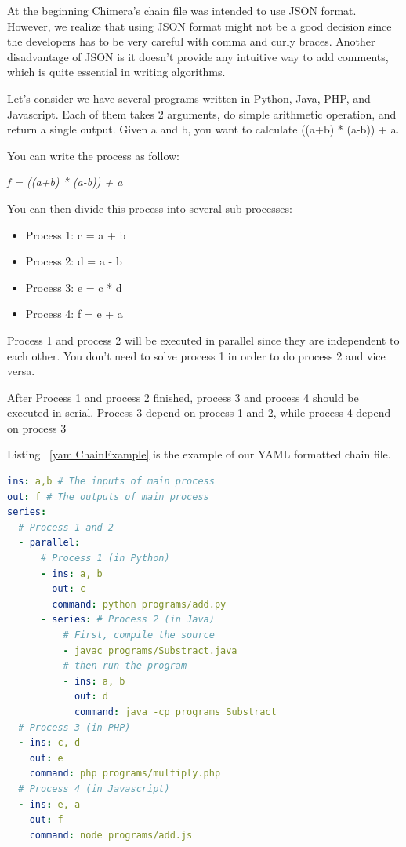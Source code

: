 \documentclass[conference]{IEEEtran}
\begin{document}
At the beginning Chimera's chain file was intended to use JSON format. However, we realize 
that using JSON format might not be a good decision since the developers has to be very 
careful with comma and curly braces. Another disadvantage
of JSON is it doesn't provide any intuitive way to add comments, which is quite
essential in writing algorithms.

Let's consider we have several programs written in Python, Java, PHP, and Javascript. 
Each of them takes 2 arguments, do simple arithmetic operation, and return a single output. 
Given a and b, you want to calculate ((a+b) * (a-b)) + a.

You can write the process as follow:

{\it f = ((a+b) * (a-b)) + a}

You can then divide this process into several sub-processes:

\begin{itemize}
    \item Process 1: c = a + b
    \item Process 2: d = a - b
    \item Process 3: e = c * d
    \item Process 4: f = e + a
\end{itemize}

Process 1 and process 2 will be executed in parallel since they are independent to each other. 
You don't need to solve process 1 in order to do process 2 and vice versa.

After Process 1 and process 2 finished, process 3 and process 4 should be executed in serial. 
Process 3 depend on process 1 and 2, while process 4 depend on process 3

Listing ~\ref{yamlChainExample} is the example of our YAML formatted chain file.

\begin{lstlisting}[caption=YAML Chain Example, label=yamlChainExample, language=yaml, basicstyle=\small, breaklines=true]
ins: a,b # The inputs of main process 
out: f # The outputs of main process 
series:
  # Process 1 and 2 
  - parallel:
      # Process 1 (in Python) 
      - ins: a, b
        out: c
        command: python programs/add.py
      - series: # Process 2 (in Java) 
          # First, compile the source  
          - javac programs/Substract.java
          # then run the program 
          - ins: a, b
            out: d
            command: java -cp programs Substract
  # Process 3 (in PHP) 
  - ins: c, d
    out: e
    command: php programs/multiply.php
  # Process 4 (in Javascript) 
  - ins: e, a
    out: f
    command: node programs/add.js
\end{lstlisting}
\end{document}
